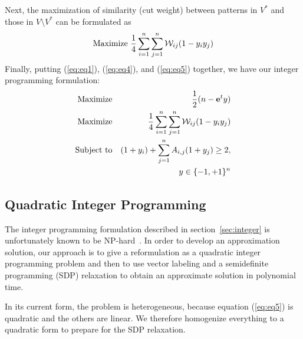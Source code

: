 \documentclass{ieee}
\def\W{{\cal W}}
\def\e{{\bf e}}
\begin{document}
Next, the maximization of similarity (cut weight) between patterns
in $V^*$ and those in $V\setminus V^*$ can be formulated as
\begin{equation}
\label{eq:eq5}
{\rm Maximize}\ {\frac{1}{4}}\sum_{i=1}^n\sum_{j=1}^n \W_{ij}(1-y_iy_j)
\end{equation}
Finally, putting (\ref{eq:eq1}), (\ref{eq:eq4}), and (\ref{eq:eq5}) together,
we have our integer programming formulation:
\begin{eqnarray*} 
{\rm Maximize}       && {\displaystyle \frac{1}{2}(n-\e^ty)} \\
{\rm Maximize}       && {\displaystyle \frac{1}{4}\sum_{i=1}^n\sum_{j=1}^n \W_{ij}(1-y_iy_j)} \\
{\rm Subject\ to}   && {\displaystyle  (1+y_i)+\sum_{j=1}^n A_{i,j}(1+y_j)\ge 2},   \nonumber\\
  && {\displaystyle y \in \{-1,+1\}^n}
\end{eqnarray*}

\vspace{-0.1in}                                                                
\subsection{Quadratic Integer Programming} 
\label{sec:quadratic}
\vspace{-0.1in}
The integer programming formulation described in
section~\ref{sec:integer} is unfortunately known to be
NP-hard~\cite{Garey79}.  In order to develop an approximation
solution, our approach is to give a reformulation as a quadratic
integer programming problem and then to use vector labeling and a
semidefinite programming (SDP) relaxation to obtain an approximate
solution in polynomial time.

In its current form, the problem is heterogeneous, because equation
(\ref{eq:eq5}) is quadratic and the others are linear.  We therefore
homogenize everything to a quadratic form to prepare for the SDP
relaxation.
 
\end{document}
